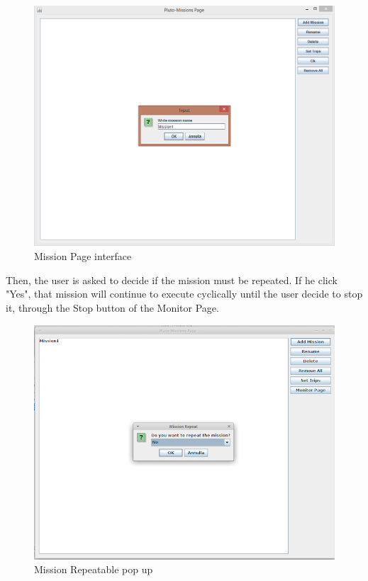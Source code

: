 \begin{figure}[htb]
  \centering
  \includegraphics[width=\linewidth]{pictures/MissionPage.png}
  \caption{Mission Page interface}
  \label{fig:MissionPage}
\end{figure}

Then, the user is asked to decide if the mission must be repeated. If he click "Yes", that mission will continue to execute cyclically until the user decide to stop it, through the Stop button of the Monitor Page.

\begin{figure}[htb]
  \centering
  \includegraphics[width=\linewidth]{pictures/missionRepeat.png}
  \caption{Mission Repeatable pop up}
  \label{fig:missionRepeat}
\end{figure}

